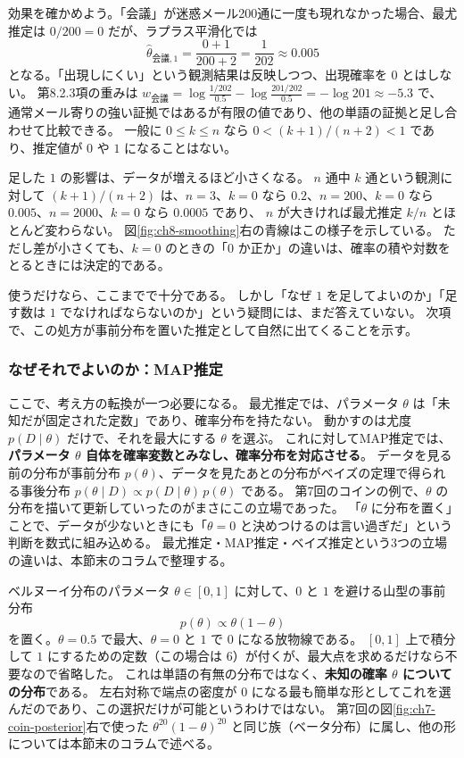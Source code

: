 効果を確かめよう。「会議」が迷惑メール200通に一度も現れなかった場合、最尤推定は $0/200 = 0$ だが、ラプラス平滑化では
\begin{equation*}
  \hat{\theta}_{\text{会議},1} = \frac{0 + 1}{200 + 2} = \frac{1}{202} \approx 0.005
\end{equation*}
となる。「出現しにくい」という観測結果は反映しつつ、出現確率を $0$ とはしない。
第8.2.3項の重みは $w_{\text{会議}} = \log\frac{1/202}{0.5} - \log\frac{201/202}{0.5} = -\log 201 \approx -5.3$ で、
通常メール寄りの強い証拠ではあるが有限の値であり、他の単語の証拠と足し合わせて比較できる。
一般に $0 \le k \le n$ なら $0 < (k + 1)/(n + 2) < 1$ であり、推定値が $0$ や $1$ になることはない。

足した $1$ の影響は、データが増えるほど小さくなる。
$n$ 通中 $k$ 通という観測に対して $(k + 1)/(n + 2)$ は、$n = 3$、$k = 0$ なら $0.2$、$n = 200$、$k = 0$ なら $0.005$、$n = 2000$、$k = 0$ なら $0.0005$ であり、
$n$ が大きければ最尤推定 $k/n$ とほとんど変わらない。
図\ref{fig:ch8-smoothing}右の青線はこの様子を示している。
ただし差が小さくても、$k = 0$ のときの「$0$ か正か」の違いは、確率の積や対数をとるときには決定的である。

使うだけなら、ここまでで十分である。
しかし「なぜ $1$ を足してよいのか」「足す数は $1$ でなければならないのか」という疑問には、まだ答えていない。
次項で、この処方が事前分布を置いた推定として自然に出てくることを示す。

\subsubsection{なぜそれでよいのか：MAP推定}

ここで、考え方の転換が一つ必要になる。
最尤推定では、パラメータ $\theta$ は「未知だが固定された定数」であり、確率分布を持たない。
動かすのは尤度 $p(D \mid \theta)$ だけで、それを最大にする $\theta$ を選ぶ。
これに対してMAP推定では、\textbf{パラメータ $\theta$ 自体を確率変数とみなし、確率分布を対応させる}。
データを見る前の分布が事前分布 $p(\theta)$、データを見たあとの分布がベイズの定理で得られる事後分布 $p(\theta \mid D) \propto p(D \mid \theta)\,p(\theta)$ である。
第7回のコインの例で、$\theta$ の分布を描いて更新していったのがまさにこの立場であった。
「$\theta$ に分布を置く」ことで、データが少ないときにも「$\theta = 0$ と決めつけるのは言い過ぎだ」という判断を数式に組み込める。
最尤推定・MAP推定・ベイズ推定という3つの立場の違いは、本節末のコラムで整理する。

ベルヌーイ分布のパラメータ $\theta \in [0, 1]$ に対して、$0$ と $1$ を避ける山型の事前分布
\begin{equation}
  p(\theta) \propto \theta(1 - \theta)
  \label{eq:ch8-beta}
\end{equation}
を置く。$\theta = 0.5$ で最大、$\theta = 0$ と $1$ で $0$ になる放物線である。
$[0, 1]$ 上で積分して $1$ にするための定数（この場合は $6$）が付くが、最大点を求めるだけなら不要なので省略した。
これは単語の有無の分布ではなく、\textbf{未知の確率 $\theta$ についての分布}である。
左右対称で端点の密度が $0$ になる最も簡単な形としてこれを選んだのであり、この選択だけが可能というわけではない。
第7回の図\ref{fig:ch7-coin-posterior}右で使った $\theta^{20}(1 - \theta)^{20}$ と同じ族（ベータ分布）に属し、他の形については本節末のコラムで述べる。

